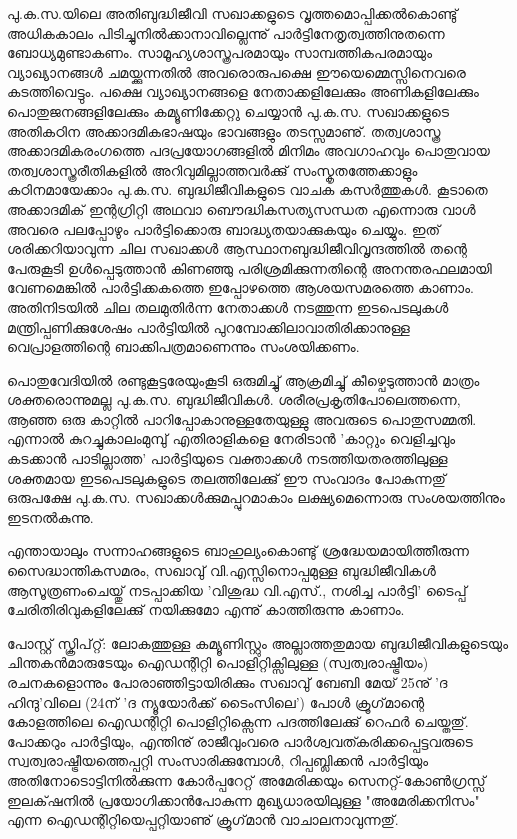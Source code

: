 പു.ക.സ.യിലെ അതിബുദ്ധിജീവി സഖാക്കളുടെ വൃത്തമൊപ്പിക്കല്‍കൊണ്ടു് അധികകാലം പിടിച്ചുനില്‍ക്കാനാവില്ലെന്നു് 
പാര്‍ട്ടിനേതൃത്വത്തിനുതന്നെ ബോധ്യമുണ്ടാകണം. സാമൂഹ്യശാസ്ത്രപരമായും സാമ്പത്തികപരമായും 
വ്യാഖ്യാനങ്ങള്‍ ചമയ്ക്കുന്നതില്‍ അവരൊരുപക്ഷെ ഈയെമ്മെസ്സിനെവരെ കടത്തിവെട്ടും. പക്ഷെ വ്യാഖ്യാനങ്ങളെ നേതാക്കളിലേക്കും 
അണികളിലേക്കും പൊതുജനങ്ങളിലേക്കും കമ്യൂണിക്കേറ്റു ചെയ്യാന്‍ പു.ക.സ. സഖാക്കളുടെ അതികഠിന അക്കാദമികഭാഷയും
ഭാവങ്ങളും തടസ്സമാണു്. തത്വശാസ്ത്ര അക്കാദമികരംഗത്തെ പദപ്രയോഗങ്ങളില്‍ മിനിമം അവഗാഹവും പൊതുവായ 
തത്വശാസ്ത്രരീതികളില്‍ അറിവുമില്ലാത്തവര്‍ക്കു് സംസ്കൃതത്തേക്കാളും കഠിനമായേക്കാം പു.ക.സ. ബുദ്ധിജീവികളുടെ വാചക
കസര്‍ത്തുകള്‍. കൂടാതെ അക്കാദമിക് ഇന്റഗ്രിറ്റി അഥവാ ബൌദ്ധികസത്യസന്ധത എന്നൊരു വാള്‍ അവരെ പലപ്പോഴും 
പാര്‍ട്ടിക്കൊരു ബാദ്ധ്യതയാക്കുകയും ചെയ്യും. ഇത് ശരിക്കറിയാവുന്ന ചില സഖാക്കള്‍ ആസ്ഥാനബുദ്ധിജീവിവൃന്ദത്തില്‍ 
തന്റെ പേരുകൂടി ഉള്‍പ്പെടുത്താന്‍ കിണഞ്ഞു പരിശ്രമിക്കുന്നതിന്റെ അനന്തരഫലമായി വേണമെങ്കില്‍ പാര്‍ട്ടിക്കകത്തെ ഇപ്പോഴത്തെ
ആശയസമരത്തെ കാണാം. അതിനിടയില്‍ ചില തലമുതിര്‍ന്ന നേതാക്കള്‍ നടത്തുന്ന ഇടപെടലുകള്‍ മന്ത്രിപ്പണിക്കുശേഷം
പാര്‍ട്ടിയില്‍ പുറമ്പോക്കിലാവാതിരിക്കാനുള്ള വെപ്രാളത്തിന്റെ ബാക്കിപത്രമാണെന്നും സംശയിക്കണം.

പൊതുവേദിയില്‍ രണ്ടുകൂട്ടരേയുംകൂടി ഒരുമിച്ചു് ആക്രമിച്ചു് കീഴ്പെടുത്താന്‍ മാത്രം ശക്തരൊന്നുമല്ല പു.ക.സ. ബുദ്ധിജീവികള്‍. 
ശരീരപ്രകൃതിപോലെത്തന്നെ, ആഞ്ഞ ഒരു കാറ്റില്‍ പാറിപ്പോകാനുള്ളതേയുള്ളു അവരുടെ പൊതുസമ്മതി. എന്നാല്‍ കുറച്ചുകാലംമുമ്പു് 
എതിരാളികളെ നേരിടാന്‍ 'കാറ്റും വെളിച്ചവും കടക്കാന്‍ പാടില്ലാത്ത' പാര്‍ട്ടിയുടെ വക്താക്കള്‍ 
നടത്തിയതരത്തിലുള്ള ശക്തമായ ഇടപെടലുകളുടെ തലത്തിലേക്കു് ഈ സംവാദം പോകുന്നതു് ഒരുപക്ഷേ പു.ക.സ. 
സഖാക്കള്‍ക്കുമപ്പുറമാകാം ലക്ഷ്യമെന്നൊരു സംശയത്തിനും ഇടനല്‍കുന്നു.

എന്തായാലും സന്നാഹങ്ങളുടെ ബാഹുല്യംകൊണ്ടു് ശ്രദ്ധേയമായിത്തീരുന്ന സൈദ്ധാന്തികസമരം, സഖാവു് വി.എസ്സിനൊപ്പമുള്ള 
ബുദ്ധിജീവികള്‍ ആസൂത്രണംചെയ്തു് നടപ്പാക്കിയ 'വിശുദ്ധ വി.എസ്., നശിച്ച പാര്‍ട്ടി' ടൈപ്പ് ചേരിതിരിവുകളിലേക്കു് 
നയിക്കുമോ എന്നു് കാത്തിരുന്നു കാണാം.

പോസ്റ്റ് സ്ക്രിപ്റ്റ്: ലോകത്തുള്ള കമ്യൂണിസ്റ്റും അല്ലാത്തതുമായ ബുദ്ധിജീവികളുടെയും ചിന്തകന്‍മാരുടേയും ഐഡന്റിറ്റി 
പൊളിറ്റിക്സിലുള്ള (സ്വത്വരാഷ്ട്രീയം) രചനകളൊന്നും പോരാഞ്ഞിട്ടായിരിക്കും സഖാവു് ബേബി മേയ് 25നു് 'ദ ഹിന്ദു'വിലെ 
(24ന് 'ദ ന്യൂയോര്‍ക്ക് ടൈംസിലെ') പോള്‍ ക്രൂഗ്‌മാന്റെ കോളത്തിലെ ഐഡന്റിറ്റി പൊളിറ്റിക്സെന്ന പദത്തിലേക്കു് 
റെഫര്‍ ചെയ്തതു്. പോക്കറും പാര്‍ട്ടിയും, എന്തിനു് രാജീവുംവരെ പാര്‍ശ്വവത്കരിക്കപ്പെട്ടവരുടെ സ്വത്വരാഷ്ട്രീയത്തെപ്പറ്റി 
സംസാരിക്കുമ്പോള്‍, റിപ്പബ്ലിക്കന്‍ പാര്‍ട്ടിയും അതിനോടൊട്ടിനില്‍ക്കുന്ന കോര്‍പ്പറേറ്റ് അമേരിക്കയും സെനറ്റ്-കോണ്‍ഗ്രസ്സ് ഇലക്‌ഷനില്‍ 
പ്രയോഗിക്കാന്‍പോകുന്ന മുഖ്യധാരയിലുള്ള "അമേരിക്കനിസം" എന്ന ഐഡന്റിറ്റിയെപ്പറ്റിയാണു് ക്രൂഗ്‌മാന്‍ വാചാലനാവുന്നതു്.

